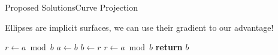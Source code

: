 \documentclass{beamer}
\begin{document}
\begin{frame}[fragile]{Proposed Solutions}{Curve Projection}
\begin{block}{}
    Ellipses are implicit surfaces, we can use their gradient to our advantage!
\end{block}

\begin{minipage}{0.45\textwidth}
    \begin{algorithmic}[1]
   \State $r\gets a\bmod b$
      \State $a\gets b$
      \State $b\gets r$
      \State $r\gets a\bmod b$
   \EndWhile\label{euclidendwhile}
   \State \textbf{return} $b$
\EndProcedure
    \end{algorithmic}
\end{minipage}
\end{frame} 
\end{document}
